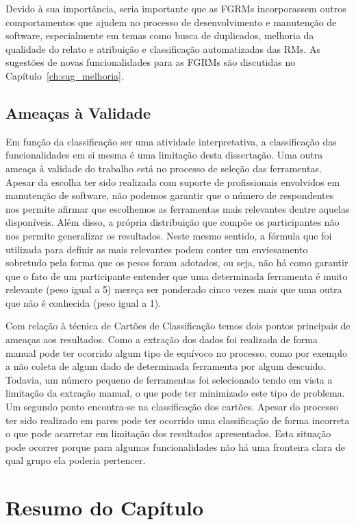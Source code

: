 Devido à sua importância, seria importante que as FGRMs incorporassem outros
comportamentos que ajudem no processo de desenvolvimento e manutenção de
software, especialmente em temas como busca de duplicados, melhoria da qualidade
do relato e atribuição e classificação automatizadas das RMs. As sugestões de
novas funcionalidades para as FGRMs são discutidas no
Capítulo~\ref{ch:sug_melhoria}.

\subsection{Ameaças à Validade}
\label{sec:ameacas_a_validade}

Em função da classificação ser uma atividade interpretativa, a classificação
das funcionalidades em si mesma é uma limitação desta dissertação. Uma outra
ameaça à validade do trabalho está no processo de seleção das ferramentas.
Apesar da escolha ter sido realizada com suporte de profissionais envolvidos em
manutenção de software, não podemos garantir que o número de respondentes nos
permite afirmar que escolhemos as ferramentas mais relevantes dentre aquelas
disponíveis. Além disso, a própria distribuição que compõe os participantes não
nos permite generalizar os resultados. Neste mesmo sentido, a fórmula que foi
utilizada para definir as mais relevantes podem conter um enviesamento
sobretudo pela forma que os pesos foram adotados, ou seja, não há como garantir
que o fato de um participante entender que uma determinada ferramenta é muito
relevante (peso igual a 5) mereça ser ponderado cinco vezes mais que uma outra
que não é conhecida (peso igual a 1).

Com relação à técnica de Cartões de Classificação temos dois pontos principais
de ameaças aos resultados. Como a extração dos dados foi realizada de forma
manual pode ter ocorrido algum tipo de equívoco no processo, como por exemplo a
não coleta de algum dado de determinada ferramenta por algum descuido. Todavia,
um número pequeno de ferramentas foi selecionado tendo em vista a limitação da
extração manual, o que pode ter minimizado este tipo de problema. Um segundo
ponto encontra-se na classificação dos cartões. Apesar do processo ter sido
realizado em pares pode ter ocorrido uma classificação de forma incorreta o que
pode acarretar em limitação dos resultados apresentados. Esta situação pode
ocorrer porque para algumas funcionalidades não há uma fronteira clara de qual
grupo ela poderia pertencer.

\section{Resumo do Capítulo}\label{sec:resumo_do_capitulo}

